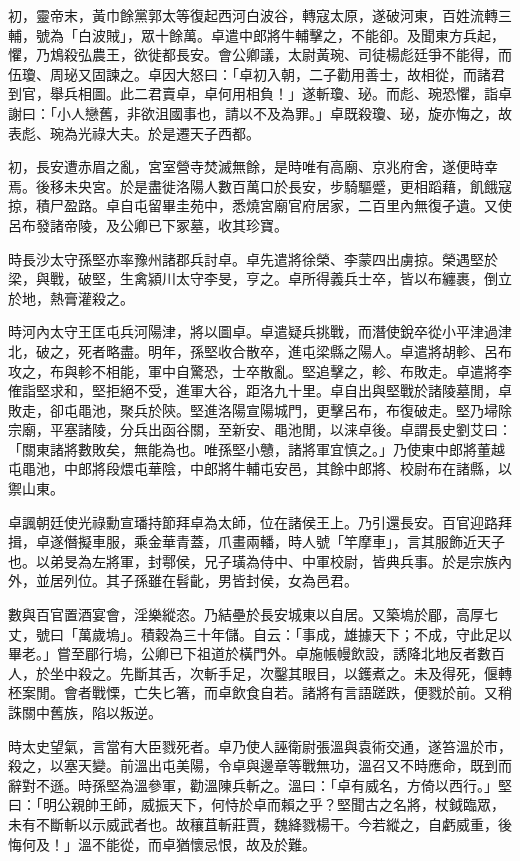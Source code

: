\begin{pinyinscope}
初，靈帝末，黃巾餘黨郭太等復起西河白波谷，轉寇太原，遂破河東，百姓流轉三輔，號為「白波賊」，眾十餘萬。卓遣中郎將牛輔擊之，不能卻。及聞東方兵起，懼，乃鴆殺弘農王，欲徙都長安。會公卿議，太尉黃琬、司徒楊彪廷爭不能得，而伍瓊、周珌又固諫之。卓因大怒曰：「卓初入朝，二子勸用善士，故相從，而諸君到官，舉兵相圖。此二君賣卓，卓何用相負！」遂斬瓊、珌。而彪、琬恐懼，詣卓謝曰：「小人戀舊，非欲沮國事也，請以不及為罪。」卓既殺瓊、珌，旋亦悔之，故表彪、琬為光祿大夫。於是遷天子西都。

初，長安遭赤眉之亂，宮室營寺焚滅無餘，是時唯有高廟、京兆府舍，遂便時幸焉。後移未央宮。於是盡徙洛陽人數百萬口於長安，步騎驅蹙，更相蹈藉，飢餓寇掠，積尸盈路。卓自屯留畢圭苑中，悉燒宮廟官府居家，二百里內無復孑遺。又使呂布發諸帝陵，及公卿已下冢墓，收其珍寶。

時長沙太守孫堅亦率豫州諸郡兵討卓。卓先遣將徐榮、李蒙四出虜掠。榮遇堅於梁，與戰，破堅，生禽潁川太守李旻，亨之。卓所得義兵士卒，皆以布纏裹，倒立於地，熱膏灌殺之。

時河內太守王匡屯兵河陽津，將以圖卓。卓遣疑兵挑戰，而潛使銳卒從小平津過津北，破之，死者略盡。明年，孫堅收合散卒，進屯梁縣之陽人。卓遣將胡軫、呂布攻之，布與軫不相能，軍中自驚恐，士卒散亂。堅追擊之，軫、布敗走。卓遣將李傕詣堅求和，堅拒絕不受，進軍大谷，距洛九十里。卓自出與堅戰於諸陵墓閒，卓敗走，卻屯黽池，聚兵於陝。堅進洛陽宣陽城門，更擊呂布，布復破走。堅乃埽除宗廟，平塞諸陵，分兵出函谷關，至新安、黽池閒，以涞卓後。卓謂長史劉艾曰：「關東諸將數敗矣，無能為也。唯孫堅小戇，諸將軍宜慎之。」乃使東中郎將董越屯黽池，中郎將段煨屯華陰，中郎將牛輔屯安邑，其餘中郎將、校尉布在諸縣，以禦山東。

卓諷朝廷使光祿勳宣璠持節拜卓為太師，位在諸侯王上。乃引還長安。百官迎路拜揖，卓遂僭擬車服，乘金華青蓋，爪畫兩轓，時人號「竿摩車」，言其服飾近天子也。以弟旻為左將軍，封鄠侯，兄子璜為侍中、中軍校尉，皆典兵事。於是宗族內外，並居列位。其子孫雖在髫齔，男皆封侯，女為邑君。

數與百官置酒宴會，淫樂縱恣。乃結壘於長安城東以自居。又築塢於郿，高厚七丈，號曰「萬歲塢」。積穀為三十年儲。自云：「事成，雄據天下；不成，守此足以畢老。」嘗至郿行塢，公卿已下祖道於橫門外。卓施帳幔飲設，誘降北地反者數百人，於坐中殺之。先斷其舌，次斬手足，次鑿其眼目，以鑊煮之。未及得死，偃轉柸案閒。會者戰慄，亡失匕箸，而卓飲食自若。諸將有言語蹉跌，便戮於前。又稍誅關中舊族，陷以叛逆。

時太史望氣，言當有大臣戮死者。卓乃使人誣衛尉張溫與袁術交通，遂笞溫於市，殺之，以塞天變。前溫出屯美陽，令卓與邊章等戰無功，溫召又不時應命，既到而辭對不遜。時孫堅為溫參軍，勸溫陳兵斬之。溫曰：「卓有威名，方倚以西行。」堅曰：「明公親帥王師，威振天下，何恃於卓而賴之乎？堅聞古之名將，杖鉞臨眾，未有不斷斬以示威武者也。故穰苴斬莊賈，魏絳戮楊干。今若縱之，自虧威重，後悔何及！」溫不能從，而卓猶懷忌恨，故及於難。


\end{pinyinscope}
